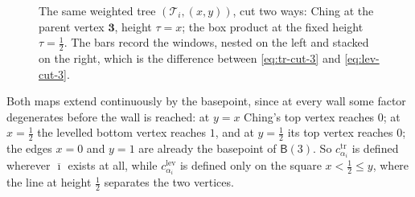 \documentclass[12pt]{amsart}
\theoremstyle{definition}
\theoremstyle{remark}
\newcommand{\BC}{\mathsf{B}}                     %
\newcommand{\TreeF}{\mathcal{T}}                 %
\begin{document}
\begin{figure}[htbp]
\caption{The same weighted tree $(\TreeF_i, (x,y))$, cut two ways: Ching at the parent vertex $\mathbf{3}$, height $\tau = x$; the box product at the fixed height $\tau = \tfrac12$. The bars record the windows, nested on the left and stacked on the right, which is the difference between \eqref{eq:tr-cut-3} and \eqref{eq:lev-cut-3}.}
\label{fig:two-cuts}
\end{figure}

Both maps extend continuously by the basepoint, since at every wall some factor degenerates before the wall is reached: at $y=x$ Ching's top vertex reaches $0$; at $x=\tfrac12$ the levelled bottom vertex reaches $1$, and at $y=\tfrac12$ its top vertex reaches $0$; the edges $x=0$ and $y=1$ are already the basepoint of $\BC(3)$. So $c^{\mathrm{tr}}_{\alpha_i}$ is defined wherever $\overline{\imath}$ exists at all, while $c^{\mathrm{lev}}_{\alpha_i}$ is defined only on the square $x<\tfrac12\leq y$, where the line at height $\tfrac12$ separates the two vertices.
\end{document}
